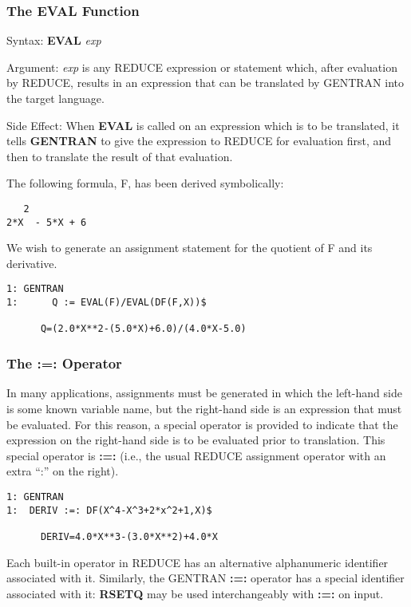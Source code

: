 \subsubsection{The EVAL Function}
\label{eval}
\begin{describe}{Syntax:}
{\bf EVAL} {\it exp}
\end{describe} 
\begin{describe}{Argument:}
{\it exp} is any REDUCE expression or statement which, after evaluation
by REDUCE, results in an expression that can be translated by
GENTRAN into the target language.
\end{describe}
\begin{describe}{Side Effect:}
When {\bf EVAL} is called on an expression which is to be translated, it
tells {\bf GENTRAN} to give the expression to REDUCE
for evaluation first, and then to translate the result of that evaluation.
\end{describe}
\begin{describe}{\example}
The following formula, F, has been derived symbolically:
\begin{verbatim}
   2
2*X  - 5*X + 6
\end{verbatim}
We wish to generate an assignment statement for the quotient
of F and its derivative.
\begin{verbatim}
1: GENTRAN
1:      Q := EVAL(F)/EVAL(DF(F,X))$

      Q=(2.0*X**2-(5.0*X)+6.0)/(4.0*X-5.0)
\end{verbatim}
\end{describe}

\subsubsection{The :=: Operator}
\index{:=:}
\label{rsetq}  
In many applications, assignments must be generated in which the
left-hand side is some known variable name, but the
right-hand side is an expression that must be evaluated.  For
this reason, a special operator is provided to indicate that the expression
on the right-hand side is to be evaluated prior to translation.  This
special operator is {\bf :=:} (i.e., the usual REDUCE assignment operator
with an extra ``:'' on the right).
\begin{describe}{\example} 
\begin{verbatim}
1: GENTRAN
1:  DERIV :=: DF(X^4-X^3+2*x^2+1,X)$

      DERIV=4.0*X**3-(3.0*X**2)+4.0*X
\end{verbatim}
\end{describe}
Each built-in operator in REDUCE has an alternative alphanumeric identifier
associated with it.  Similarly, the GENTRAN {\bf :=:} operator has a
special identifier associated with it: {\bf RSETQ} may be used 
interchangeably with {\bf :=:} on input.
